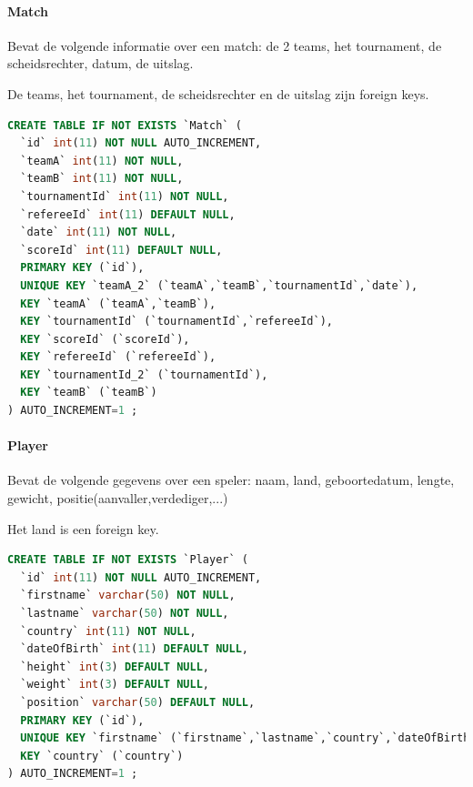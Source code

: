 \documentclass[11pt]{article}
\begin{document}
        
        
        
        
    \paragraph{Match}
        Bevat de volgende informatie over een match:
            de 2 teams, het tournament, de scheidsrechter, datum, de uitslag.
            
        De teams, het tournament, de scheidsrechter en de uitslag zijn foreign keys.
        
        \begin{framed}
        \begin{lstlisting}[language=sql]
CREATE TABLE IF NOT EXISTS `Match` (
  `id` int(11) NOT NULL AUTO_INCREMENT,
  `teamA` int(11) NOT NULL,
  `teamB` int(11) NOT NULL,
  `tournamentId` int(11) NOT NULL,
  `refereeId` int(11) DEFAULT NULL,
  `date` int(11) NOT NULL,
  `scoreId` int(11) DEFAULT NULL,
  PRIMARY KEY (`id`),
  UNIQUE KEY `teamA_2` (`teamA`,`teamB`,`tournamentId`,`date`),
  KEY `teamA` (`teamA`,`teamB`),
  KEY `tournamentId` (`tournamentId`,`refereeId`),
  KEY `scoreId` (`scoreId`),
  KEY `refereeId` (`refereeId`),
  KEY `tournamentId_2` (`tournamentId`),
  KEY `teamB` (`teamB`)
) AUTO_INCREMENT=1 ;
        \end{lstlisting}
        \end{framed}
        
        
        
        
    \paragraph{Player}
        Bevat de volgende gegevens over een speler:
            naam, land, geboortedatum, lengte, gewicht, positie(aanvaller,verdediger,...)
            
        Het land is een foreign key.
        
        \begin{framed}
        \begin{lstlisting}[language=sql]
CREATE TABLE IF NOT EXISTS `Player` (
  `id` int(11) NOT NULL AUTO_INCREMENT,
  `firstname` varchar(50) NOT NULL,
  `lastname` varchar(50) NOT NULL,
  `country` int(11) NOT NULL,
  `dateOfBirth` int(11) DEFAULT NULL,
  `height` int(3) DEFAULT NULL,
  `weight` int(3) DEFAULT NULL,
  `position` varchar(50) DEFAULT NULL,
  PRIMARY KEY (`id`),
  UNIQUE KEY `firstname` (`firstname`,`lastname`,`country`,`dateOfBirth`),
  KEY `country` (`country`)
) AUTO_INCREMENT=1 ;
        \end{lstlisting}
        \end{framed}
        
\end{document}
